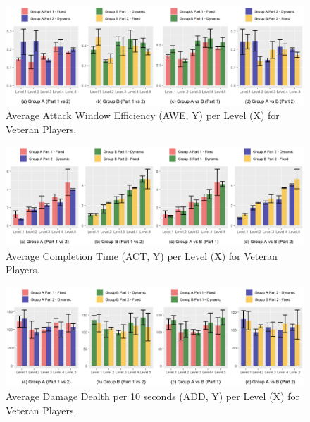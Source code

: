 \begin{figure}[!ht]
    \caption{Average Attack Window Efficiency (AWE, Y) per Level (X) for Veteran Players.}
    \begin{center}
        \includegraphics[width=34em]{figures/attack_window_efficiency-veteran_players.png}
    \end{center}
    \label{fig:result-metric-veterans-attack-window-efficiency}
\end{figure}

\begin{figure}[!ht]
    \caption{Average Completion Time (ACT, Y) per Level (X) for Veteran Players.}
    \begin{center}
        \includegraphics[width=34em]{figures/completion_time-veteran_players.png}
    \end{center}
    \label{fig:result-metric-veterans-completion-time}
\end{figure}

\begin{figure}[!ht]
    \caption{Average Damage Dealth per 10 seconds (ADD, Y) per Level (X) for Veteran Players.}
    \begin{center}
        \includegraphics[width=34em]{figures/damage_dealt_per_10s-veteran_players.png}
    \end{center}
    \label{fig:result-metric-veterans-damage-dealt-per-10s}
\end{figure}

